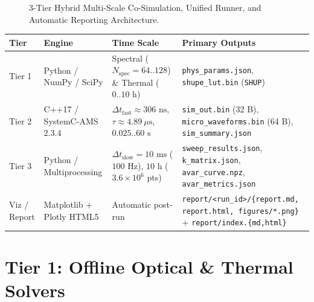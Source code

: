 \documentclass[11pt,a4paper]{article}
\begin{document}
\begin{figure}[h!]
{%
}
\caption{3-Tier Hybrid Multi-Scale Co-Simulation, Unified Runner, and Automatic Reporting Architecture.}
\end{figure}

\footnotesize
\begin{tabularx}{\textwidth}{@{}p{1.65cm} p{3.1cm} p{4.15cm} X@{}}
\toprule
\textbf{Tier} & \textbf{Engine} & \textbf{Time Scale} & \textbf{Primary Outputs} \\
\midrule
Tier 1 & Python / NumPy / SciPy & Spectral ($N_{\text{spec}}=64..128$) \& Thermal ($0..10\text{ h}$) & \texttt{phys\_params.json}, \texttt{shupe\_lut.bin} (\texttt{SHUP}) \\
Tier 2 & C++17 / SystemC-AMS 2.3.4 & $\Delta t_{\text{fast}} \approx 306\text{ ns}$, $\tau \approx 4.89\ \mu\text{s}$, $0.025..60\text{ s}$ & \texttt{sim\_out.bin} (32 B), \texttt{micro\_waveforms.bin} (64 B), \texttt{sim\_summary.json} \\
Tier 3 & Python / Multiprocessing & $\Delta t_{\text{slow}} = 10\text{ ms}$ ($100\text{ Hz}$), $10\text{ h}$ ($3.6\times 10^6$ pts) & \texttt{sweep\_results.json}, \texttt{k\_matrix.json}, \texttt{avar\_curve.npz}, \texttt{avar\_metrics.json} \\
Viz / Report & Matplotlib + Plotly HTML5 & Automatic post-run & \texttt{report/<run\_id>/\{report.md, report.html, figures/*.png\}} + \texttt{report/index.\{md,html\}} \\
\bottomrule
\end{tabularx}
\normalsize

\section{Tier 1: Offline Optical \& Thermal Solvers}
\end{document}

